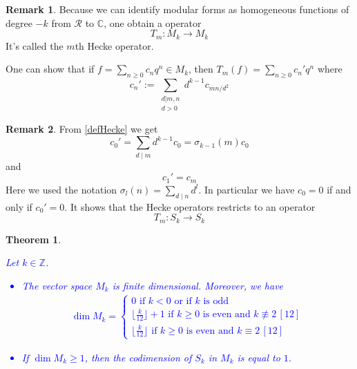\documentclass[12pt,a4paper,english]{article}
\theoremstyle{plain}
\newtheorem{thm}{Theorem}[section]
\theoremstyle{definition}
\newtheorem*{rem}{Remark}
\begin{document}
\begin{rem}
Because we can identify modular forms as homogeneous functions of degree $-k$ from $\mathcal{R}$ to $\mathbb{C}$, one obtain a operator
\begin{equation*}
    T_m:M_k\longrightarrow M_k
\end{equation*}
It's called the $m$th Hecke operator.

One can show that if $f=\sum_{n\geqslant 0}c_n q^n\in M_k$, then $T_m(f)=\sum_{n\geqslant 0}c_n' q^n$ where
\begin{equation}\label{defHecke}
    c_n':=\sum_{\substack{d\vert m,n\\
                  d>0}}
        d^{k-1}c_{mn/d^2}
\end{equation}
\end{rem}

\begin{rem}
From \eqref{defHecke} we get
\begin{equation*}
    c_0'=\sum_{d\mid m}d^{k-1}c_0=\sigma_{k-1}(m)c_0
\end{equation*}
and 
\begin{equation*}
    c_1'=c_m
\end{equation*}
Here we used the notation $\sigma_l(n)=\sum_{d\mid n}d^l$. In particular we have $c_0=0$ if and only if $c_0'=0$. It shows that the Hecke operators restricts to an operator
\begin{equation*}
    T_m:S_k\longrightarrow S_k
\end{equation*}
\end{rem}



\begin{thm}\label{dimMk}
\textcolor{blue}{
Let $k\in\mathbb{Z}$.
\begin{itemize}
    \item[(i)] The vector space $M_k$ is finite dimensional. Moreover, we have
\begin{align}\label{EqdimMk}
\dim M_k=\left\{
    \begin{array}{ll}
        0\text{ if }k<0\text{ or if }k\text{ is odd}\\
        \lfloor\frac{k}{12}\rfloor +1\text{ if }k\geqslant 0\text{ is even and }k\not\equiv 2\, [12]\\
        \lfloor\frac{k}{12}\rfloor \text{ if }k\geqslant 0\text{ is even and }k\equiv 2\, [12]
    \end{array}
\right.
\end{align}
\item[(ii)] If $\dim M_k\geqslant 1$, then the codimension of $S_k$ in $M_k$ is equal to $1$.
\end{itemize}
}
\end{thm}
\end{document}
